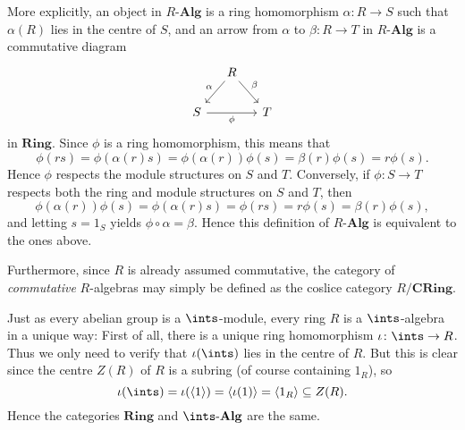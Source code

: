\documentclass[article, a4paper, 11pt, oneside]{memoir}
\numberwithin{equation}{chapter}
\DeclarePairedDelimiter{\gen}{\langle}{\rangle} %
\newcommand{\scat}[1]{\mathbf{#1}} %
\newcommand{\ncat}[1]{\mathbf{#1}} %
\newcommand{\catRing}{\ncat{Ring}} %
\newcommand{\catCRing}{\ncat{CRing}} %
\newcommand{\catAlg}[1]{{#1\text{-}\scat{Alg}}}
\newcommand{\catRAlg}{\catAlg{R}}
\theoremstyle{nonumberplain}
\begin{document}
\begin{remarkbreak}
\begin{enumerate}
        More explicitly, an object in $\catRAlg$ is a ring homomorphism $\alpha \colon R \to S$ such that $\alpha(R)$ lies in the centre of $S$, and an arrow from $\alpha$ to $\beta \colon R \to T$ in $\catRAlg$ is a commutative diagram
        \begin{equation*}
            \begin{tikzcd}[column sep=small]
                & R
                    \ar[dl, "\alpha", swap]
                    \ar[dr, "\beta"]
                \\
                S
                    \ar[rr, "\phi", swap]
                && T
            \end{tikzcd}
        \end{equation*}
        in $\catRing$. Since $\phi$ is a ring homomorphism, this means that
        \begin{equation*}
            \phi(rs)
                = \phi(\alpha(r)s)
                = \phi(\alpha(r)) \phi(s)
                = \beta(r) \phi(s)
                = r \phi(s).
        \end{equation*}
        Hence $\phi$ respects the module structures on $S$ and $T$. Conversely, if $\phi \colon S \to T$ respects both the ring and module structures on $S$ and $T$, then
        \begin{equation*}
            \phi(\alpha(r)) \phi(s)
                = \phi(\alpha(r)s)
                = \phi(rs)
                = r \phi(s)
                = \beta(r) \phi(s),
        \end{equation*}
        and letting $s = 1_S$ yields $\phi \circ \alpha = \beta$. Hence this definition of $\catRAlg$ is equivalent to the ones above.

        Furthermore, since $R$ is already assumed commutative, the category of \emph{commutative} $R$-algebras may simply be defined as the coslice category $R/\catCRing$.
    \end{enumerate}
\end{remarkbreak}


\begin{remarkbreak}
    Just as every abelian group is a $\ints$-module, every ring $R$ is a $\ints$-algebra in a unique way: First of all, there is a unique ring homomorphism $\iota \colon \ints \to R$. Thus we only need to verify that $\iota(\ints)$ lies in the centre of $R$. But this is clear since the centre $Z(R)$ of $R$ is a subring (of course containing $1_R$), so
    \begin{equation*}
        \iota(\ints)
            = \iota(\gen{1})
            = \gen{\iota(1)}
            = \gen{1_R}
            \subseteq Z(R).
    \end{equation*}
    Hence the categories $\catRing$ and $\catAlg{\ints}$ are the same.
\end{remarkbreak}
\end{document}
